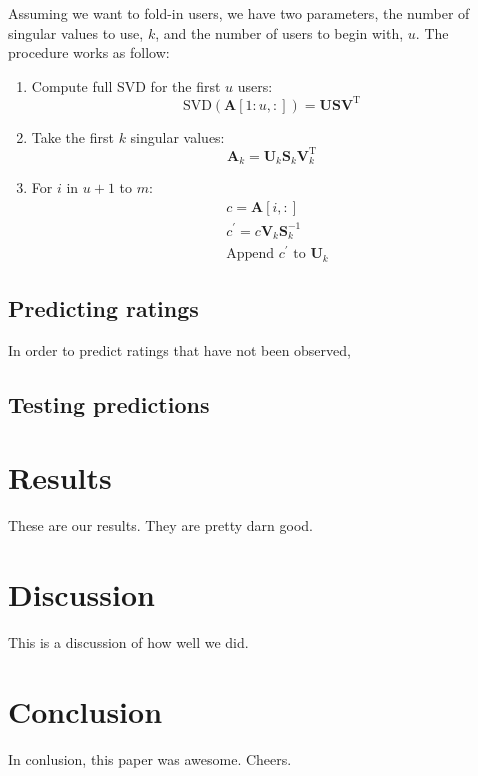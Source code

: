 \documentclass{article} %
\newcommand{\A}{\mathbf{A}}
\newcommand{\T}{\textrm{T}}
\begin{document}
Assuming we want to fold-in users, we have two parameters, the number of singular values to use, $k$, and the number of users to begin with, $u$. 
The procedure works as follow:

\begin{enumerate}
\item Compute full SVD for the first $u$ users:
$$\textrm{SVD}(\A[1:u,:]) = \mathbf{U}\mathbf{S}\mathbf{V}^{\T}$$
\item Take the first $k$ singular values:
$$\A_k= \mathbf{U}_k\mathbf{S}_k\mathbf{V}_k^{\T}$$
\item For $i$ in $u+1$ to $m$:
\begin{align*}
&c = \A[i,:]\\
&c^{\prime} = c \mathbf{V}_k \mathbf{S}_k^{-1}\\
&\textrm{Append $c^{\prime}$ to $\mathbf{U}_k$}
\end{align*}


\end{enumerate}

\subsection{Predicting ratings}
In order to predict ratings that have not been observed, 

\subsection{Testing predictions}

\section{Results}
These are our results. They are pretty darn good.

\begin{comment}
\begin{figure}[H]
\begin{center}
\fbox{\texttt{[image: scatter\_results]}}
\end{center}
\caption{Performance of the edge weight inference algorithm for a graph with $|V| = 100$ and $|E|= 348$}
\label{fig:scatter1}
\end{figure}
\end{comment}

\section{Discussion}
This is a discussion of how well we did.

\section{Conclusion}
In conlusion, this paper was awesome. Cheers.



\end{document}
